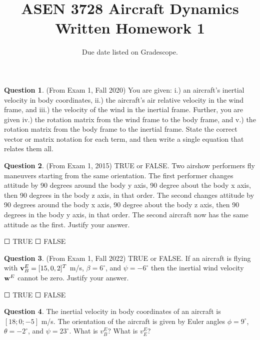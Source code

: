 \documentclass{article}
\title{ASEN 3728 Aircraft Dynamics\\Written Homework 1}
\date{Due date listed on Gradescope.}
\theoremstyle{definition}
\newtheorem{question}{Question}
\newcommand{\option}{{\Large$\Square$ }}
\begin{document}
\maketitle

\begin{question}(From Exam 1, Fall 2020)
    You are given: i.) an aircraft’s inertial velocity in body coordinates, ii.) the aircraft’s air relative velocity in the wind frame, and iii.) the velocity of the wind in the inertial frame. Further, you are given iv.) the rotation matrix from the wind frame to the body frame, and v.) the rotation matrix from the body frame to the inertial frame. State the correct vector or matrix notation for each term, and then write a single equation that relates them all.
\end{question}

\vspace{6cm}

\begin{question}(From Exam 1, 2015)
    TRUE or FALSE. Two airshow performers fly maneuvers starting from the same orientation. The first performer changes attitude by 90 degrees around the body y axis, 90 degree about the body x axis, then 90 degrees in the body z axis, in that order. The second changes attitude by 90 degrees around the body x axis, 90 degree about the body z axis, then 90 degrees in the body y axis, in that order. The second aircraft now has the same attitude as the first.  Justify your answer.
\end{question}
\vspace{1ex}
\option TRUE \hspace{1cm} \option FALSE

\clearpage

\begin{question}(From Exam 1, Fall 2022)
    TRUE or FALSE. If an aircraft is flying with ${\bf v}^E_B = [15, 0, 2]^T$ m/s, $\beta = 6^{\circ}$, and $\psi = -6^{\circ}$ then the inertial wind velocity ${\bf w}^E$ cannot be zero.  Justify your answer.
\end{question}
\vspace{1ex}
\option TRUE \hspace{1cm} \option FALSE


\vspace{8cm}

\begin{question}
    The inertial velocity in body coordinates of an aircraft is $[18; 0; -5]$ m/s. The orientation of the aircraft is given by Euler angles $\phi = 9^{\circ}$, $\theta = -2^{\circ}$, and $\psi = 23^{\circ}$. What is $v_B^E$? What is $v_E^E$?
\end{question}
\end{document}
